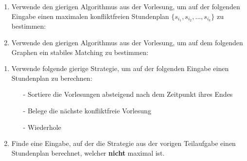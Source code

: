 \documentclass{uebung_cs}
\begin{document}
\begin{aufgabe}\phantom{.}
    \begin{enumerate}
        \item Verwende den gierigen Algorithmus aus der Vorlesung, um auf der folgenden Eingabe einen maximalen konfliktfreien Stundenplan $\{s_{i_1}, s_{i_2}, \dots, s_{i_k}\}$ zu bestimmen:
        \begin{center}
        \end{center}
        \item Verwende den gierigen Algorithmus aus der Vorlesung, um auf dem folgenden Graphen ein stabiles Matching zu bestimmen:
    \end{enumerate}
\end{aufgabe}

\begin{aufgabe}\phantom{.}
    \begin{enumerate}
        \item Verwende folgende gierige Strategie, um auf der folgenden Eingabe einen Stundenplan zu berechnen:
        \begin{itemize}
            \item[-] Sortiere die Vorlesungen absteigend nach dem Zeitpunkt ihres Endes
            \item[-] Belege die nächste konfliktfreie Vorlesung
            \item[-] Wiederhole 
        \end{itemize}
        \item Finde eine Eingabe, auf der die Strategie aus der vorigen Teilaufgabe einen Stundenplan berechnet, welcher \textbf{nicht} maximal ist.
    \end{enumerate}
\end{aufgabe}
\end{document}
